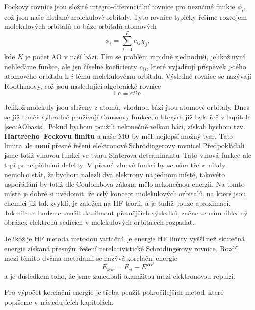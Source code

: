 Fockovy rovnice jsou složité integro-diferencíální rovnice pro neznámé funkce $\phi_i$,
což jsou naše hledané molekulové orbitaly.
Tyto rovnice typicky řešíme rozvojem molekulových orbitalů do báze orbitalů atomových
\begin{equation}
\phi_i=\sum_{j=1}^K c_{ij} \chi_j ,
\end{equation}
kde $K$ je počet AO v naší bázi. Tím se problém rapidně zjednoduší, jelikož nyní nehledáme funkce, ale jen číselné koeficienty $c_{ij}$, které vyjadřují příspěvek $j$-tého atomového orbitalu k $i$-tému molekulovému orbitalu.
Výsledné rovnice se nazývají Roothanovy, což jsou následující algebraické rovnice
\begin{equation}
\mathbb{F} \mathbf{c} = \varepsilon \mathbb{S} \mathbf{c} .
\end{equation}

Jelikož molekuly jsou složeny z atomů, vhodnou bází jsou atomové orbitaly.
Dnes se již téměř výhradně používají Gaussovy funkce, o kterých již byla řeč v kapitole \ref{sec:AObasis}.
Pokud bychom použili nekonečně velkou bázi, získali bychom tzv. \textbf{Hartreeho--Fockovu limitu} a naše MO by měli nejlepší možný tvar. Tato limita ale \textbf{není} přesné řešení elektronové Schr\"{o}dingerovy rovnice!
Předpokládali jsme totiž vlnovou funkci ve tvaru Slaterova determinantu. Tato vlnová funkce ale trpí principiálními defekty. V přesné vlnové funkci by se nám třeba nikdy nemohlo stát, že bychom nalezli dva elektrony na jednom místě, takovéto uspořádání by totiž dle Coulombova zákona mělo nekonečnou energii.
Na tomto místě je dobré si uvědomit, že celý koncept molekulových orbitalů, na které jsou chemici již tak zvyklí, je založen na HF teorii, a je tudíž pouze aproximací. Jakmile se budeme snažit dosáhnout přesnějších výsledků, začne se nám úhledný obrázek elektronů sedících v molekulových orbitalech rozpadat.

Jelikož je HF metoda metodou variační, je energie HF limity vyšší než skutečná energie získaná přesným řešení nerelativistické Schr\"{o}dingerovy rovnice.
Rozdíl mezi těmito dvěma metodami se nazývá korelační energie
\begin{equation}
E_{kor}=E_{el} - E^{HF}
\end{equation}
a je důsledkem toho, že jsme zanedbali okamžitou mezi-elektronovou repulzi.


Pro výpočet korelační energie je třeba použít pokročilejších metod, které popíšeme v následujících kapitolách.

